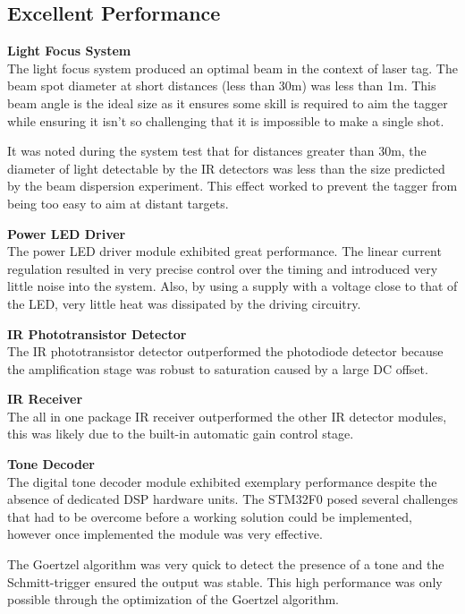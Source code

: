 


\subsection{Excellent Performance}

\textbf{Light Focus System}\\
The light focus system produced an optimal beam in the context of laser tag. The beam spot diameter at short distances (less than 30m) was less than 1m. This beam angle is the ideal size as it ensures some skill is required to aim the tagger while ensuring it isn't so challenging that it is impossible to make a single shot.

It was noted during the system test that for distances greater than 30m, the diameter of light detectable by the IR detectors was less than the size predicted by the beam dispersion experiment. This effect worked to prevent the tagger from being too easy to aim at distant targets.

\textbf{Power LED Driver}\\
The power LED driver module exhibited great performance. The linear current regulation resulted in very precise control over the timing and introduced very little noise into the system. Also, by using a supply with a voltage close to that of the LED, very little heat was dissipated by the driving circuitry.

\textbf{IR Phototransistor Detector}\\
The IR phototransistor detector outperformed the photodiode detector because the amplification stage was robust to saturation caused by a large DC offset.

\textbf{IR Receiver}\\
The all in one package IR receiver outperformed the other IR detector modules, this was likely due to the built-in automatic gain control stage.

\textbf{Tone Decoder}\\ %
The digital tone decoder module exhibited exemplary performance despite the absence of dedicated DSP hardware units. The STM32F0 posed several challenges that had to be overcome before a working solution could be implemented, however once implemented the module was very effective.

The Goertzel algorithm was very quick to detect the presence of a tone and the Schmitt-trigger ensured the output was stable. This high performance was only possible through the optimization of the Goertzel algorithm.

